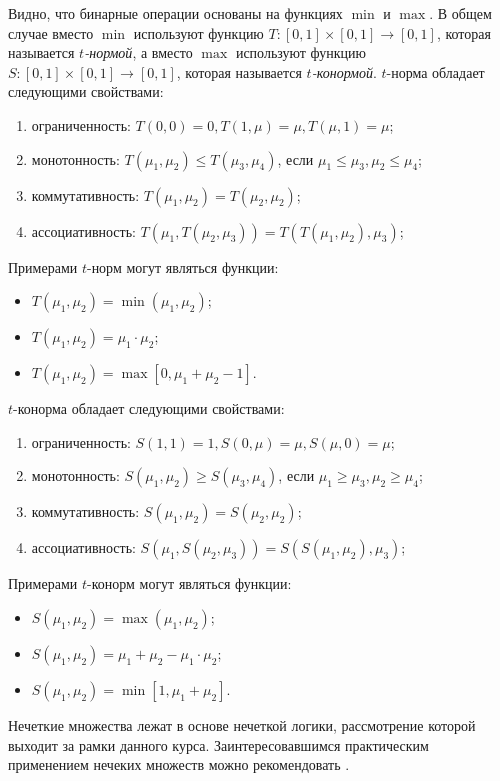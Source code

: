 Видно, что бинарные операции основаны на функциях $\min$ и $\max$. В общем случае вместо $\min$ используют функцию $T:[0,1]\times[0,1]\to[0,1]$, которая называется \emph{$t$-нормой}, а вместо $\max$ используют функцию $S:[0,1]\times[0,1]\to[0,1]$, которая называется \emph{$t$-конормой}. $t$-норма обладает следующими свойствами:
\begin{enumerate}
    \item ограниченность: $T(0,0)=0,T(1,\mu)=\mu,T(\mu,1)=\mu$;
    \item монотонность: $T(\mu_1,\mu_2)\leq T(\mu_3,\mu_4)$, если $\mu_1\leq\mu_3, \mu_2\leq\mu_4$;
    \item коммутативность: $T(\mu_1,\mu_2)=T(\mu_2,\mu_2)$;
    \item ассоциативность: $T(\mu_1,T(\mu_2, \mu_3))=T(T(\mu_1,\mu_2),\mu_3)$;
\end{enumerate}

Примерами $t$-норм могут являться функции:
\begin{itemize}
    \item $T(\mu_1,\mu_2)=\min(\mu_1,\mu_2)$;
    \item $T(\mu_1,\mu_2)=\mu_1\cdot \mu_2$;
    \item $T(\mu_1,\mu_2)=\max[0,\mu_1+\mu_2-1]$.
\end{itemize}

$t$-конорма обладает следующими свойствами:
\begin{enumerate}
    \item ограниченность: $S(1,1)=1,S(0,\mu)=\mu,S(\mu,0)=\mu$;
    \item монотонность: $S(\mu_1,\mu_2)\geq S(\mu_3,\mu_4)$, если $\mu_1\geq\mu_3, \mu_2\geq\mu_4$;
    \item коммутативность: $S(\mu_1,\mu_2)=S(\mu_2,\mu_2)$;
    \item ассоциативность: $S(\mu_1,S(\mu_2, \mu_3))=S(S(\mu_1,\mu_2),\mu_3)$;
\end{enumerate}

Примерами $t$-конорм могут являться функции:
\begin{itemize}
    \item $S(\mu_1,\mu_2)=\max(\mu_1,\mu_2)$;
    \item $S(\mu_1,\mu_2)=\mu_1+\mu_2-\mu_1\cdot\mu_2$;
    \item $S(\mu_1,\mu_2)=\min[1,\mu_1+\mu_2]$.
\end{itemize}

Нечеткие множества лежат в основе нечеткой логики, рассмотрение которой выходит за рамки данного курса. Заинтересовавшимся практическим применением нечеких множеств можно рекомендовать \cite{bib:osovsky:neyro}.

